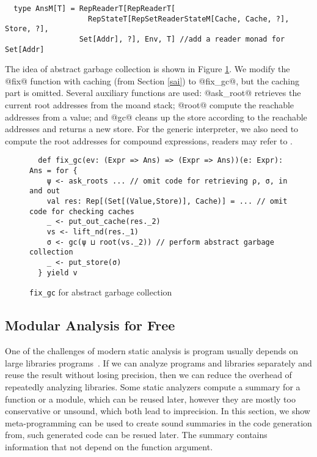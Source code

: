 \begin{lstlisting}
  type AnsM[T] = RepReaderT[RepReaderT[
                   RepStateT[RepSetReaderStateM[Cache, Cache, ?], Store, ?],
                 Set[Addr], ?], Env, T] //add a reader monad for Set[Addr]
\end{lstlisting}

The idea of abstract garbage collection is shown in Figure \ref{fixgc}. We modify the @fix@
function with caching (from Section \ref{sai}) to @fix_gc@, but the caching part
is omitted. Several auxiliary functions are used: @ask_root@ retrieves the
current root addresses from the moand stack; @root@ compute the reachable
addresses from a value; and @gc@ cleans up the store according to the reachable
addresses and returns a new store. For the generic interpreter, we also need to
compute the root addresses for compound expressions, readers may refer to
\cite{DBLP:journals/pacmpl/DaraisLNH17}.

\begin{figure}[h!]
\begin{lstlisting}
  def fix_gc(ev: (Expr => Ans) => (Expr => Ans))(e: Expr): Ans = for {
    ψ <- ask_roots ... // omit code for retrieving ρ, σ, in and out
    val res: Rep[(Set[(Value,Store)], Cache)] = ... // omit code for checking caches
    _ <- put_out_cache(res._2)
    vs <- lift_nd(res._1)
    σ <- gc(ψ ⊔ root(vs._2)) // perform abstract garbage collection
    _ <- put_store(σ)
  } yield v
\end{lstlisting}
\vspace{-1em}
\caption{\texttt{fix\_gc} for abstract garbage collection} \label{fixgc}
\end{figure}




\subsection{Modular Analysis for Free} \label{modular}


One of the challenges of modern static analysis is program usually depends on
large libraries programs~\cite{toman_et_al:LIPIcs:2017:7121}. If we can analyze
programs and libraries separately and reuse the result without losing precision,
then we can reduce the overhead of repeatedly analyzing libraries.
Some static analyzers compute a summary for a function or a module, which
can be reused later, however they are mostly too conservative or unsound, which
both lead to imprecision. In this section, we show meta-programming can be used
to create sound summaries in the code generation from, such generated code can
be resued later. The summary contains information that not depend on the
function argument.

